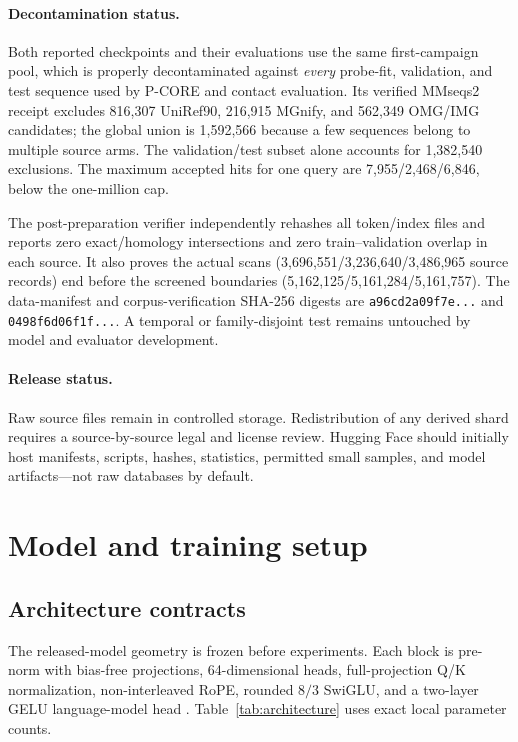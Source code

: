\documentclass{article}
\newcommand{\code}[1]{\texttt{#1}}
\begin{document}
\paragraph{Decontamination status.}
Both reported checkpoints and their evaluations use the same first-campaign
pool, which is properly decontaminated against
\emph{every} probe-fit, validation, and test sequence used by P-CORE and
contact evaluation. Its verified MMseqs2 receipt excludes 816,307 UniRef90,
216,915 MGnify, and 562,349 OMG/IMG candidates; the global union is 1,592,566
because a few sequences belong to multiple source arms. The validation/test
subset alone accounts for 1,382,540 exclusions. The maximum accepted hits for
one query are 7,955/2,468/6,846, below the one-million cap.

The post-preparation verifier independently rehashes all token/index files and
reports zero exact/homology intersections and zero train--validation overlap in
each source. It also proves the actual scans (3,696,551/3,236,640/3,486,965
source records) end before the screened boundaries
(5,162,125/5,161,284/5,161,757). The data-manifest and corpus-verification
SHA-256 digests are \code{a96cd2a09f7e...} and \code{0498f6d06f1f...}.
A temporal or family-disjoint test remains untouched by model and evaluator
development.

\paragraph{Release status.}
Raw source files remain in controlled storage. Redistribution of any derived
shard requires a source-by-source legal and license review. Hugging Face should
initially host manifests, scripts, hashes, statistics, permitted small samples,
and model artifacts---not raw databases by default.

\section{Model and training setup}
\label{app:training}

\subsection{Architecture contracts}

The released-model geometry is frozen before experiments. Each block is
pre-norm with bias-free projections, 64-dimensional heads, full-projection Q/K
normalization, non-interleaved RoPE, rounded $8/3$ SwiGLU, and a two-layer GELU
language-model head \citep{candido2026language}. Table~\ref{tab:architecture}
uses exact local parameter counts.
\end{document}
